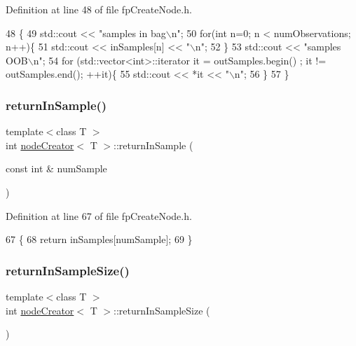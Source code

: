 Definition at line 48 of file fp\+Create\+Node.\+h.


\begin{DoxyCode}
48                        \{
49             std::cout << \textcolor{stringliteral}{"samples in bag\(\backslash\)n"};
50             \textcolor{keywordflow}{for}(\textcolor{keywordtype}{int} n=0; n < numObservations; n++)\{
51                 std::cout << inSamples[n] << \textcolor{stringliteral}{"\(\backslash\)n"};
52             \}
53             std::cout << \textcolor{stringliteral}{"samples OOB\(\backslash\)n"};
54             \textcolor{keywordflow}{for} (std::vector<int>::iterator it = outSamples.begin() ; it != outSamples.end(); ++it)\{
55                 std::cout << *it << \textcolor{stringliteral}{"\(\backslash\)n"};
56             \}
57         \}
\end{DoxyCode}
\mbox{\label{classnodeCreator_a93a55fecae013dfac2bf46d4e0be14f5}} 
\subsubsection{\texorpdfstring{return\+In\+Sample()}{returnInSample()}}
{\footnotesize\ttfamily template$<$class T $>$ \\
int \hyperlink{classnodeCreator}{node\+Creator}$<$ T $>$\+::return\+In\+Sample (\begin{DoxyParamCaption}\item[{const int \&}]{num\+Sample }\end{DoxyParamCaption})\hspace{0.3cm}{\ttfamily [inline]}}



Definition at line 67 of file fp\+Create\+Node.\+h.


\begin{DoxyCode}
67                                                        \{
68             \textcolor{keywordflow}{return} inSamples[numSample];
69         \}
\end{DoxyCode}
\mbox{\label{classnodeCreator_a78a2ed85f6f25f7f8f1f6f65f3bf3e78}} 
\subsubsection{\texorpdfstring{return\+In\+Sample\+Size()}{returnInSampleSize()}}
{\footnotesize\ttfamily template$<$class T $>$ \\
int \hyperlink{classnodeCreator}{node\+Creator}$<$ T $>$\+::return\+In\+Sample\+Size (\begin{DoxyParamCaption}{ }\end{DoxyParamCaption})\hspace{0.3cm}{\ttfamily [inline]}}



